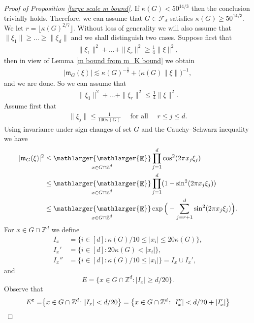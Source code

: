 \documentclass[a4paper,oneside, reqno]{amsart}
\numberwithin{equation}{section}
\theoremstyle{definition}%
\theoremstyle{definition}
\theoremstyle{definition}%
\theoremstyle{definition}
\newcommand{\E}{\mathop{\mathbb{E}}}
\newcommand{\Z}{\mathbb{Z}}
\newcommand{\se}[1]{\underset{_{\substack{#1}}}{\mathlarger{\mathlarger{\E}}}}
\begin{document}
\begin{proof}[Proof of Proposition \ref{large scale m bound}]
If
$\kappa(G)< 50^{14/3}$ then the conclusion trivially
holds. Therefore, we can assume that $G\in\mathcal{F}_d$ satisfies
$\kappa(G)\ge50^{14/3}$.  We let 
$r= \lfloor \kappa(G)^{2/7} \rfloor$.
Without loss of generality we will also assume that $\|\xi_1\|\ge\ldots\ge\|\xi_d\|$ and we shall
distinguish two cases.  Suppose first that
\begin{align*}
  \|\xi_1\|^2+\ldots+\|\xi_r\|^2\ge\frac{1}{4}\|\xi\|^2,
\end{align*}
then in view of Lemma \ref{m bound from m_K bound} we obtain 
\begin{align*}
  |\mathfrak m_G(\xi)|\lesssim \kappa(G)^{-\frac{1}{7}}+\big(\kappa(G)\|\xi\|\big)^{-1},
\end{align*}
and we are done. So we can assume that
\begin{align}
  \label{eq:54}
  \|\xi_1\|^2+\ldots+\|\xi_r\|^2\le\frac{1}{4}\|\xi\|^2.  
\end{align}
Assume first that
\begin{align}
  \label{eq:55}
  \|\xi_j\|\le\frac{1}{100\kappa(G)}\quad\text{ for all } \quad r\le
  j\le d.
\end{align}
Using invariance under sign changes of set $G$ and the Cauchy--Schwarz inequality we have
\begin{align}
  \label{eq:56}
  \begin{split}
  |\mathfrak m_G(\xi)|^2&\le \se{x\in
                          G\cap\Z^d}\prod_{j=1}^d \cos^2(2\pi x_j \xi_j)\\
  &\le \se{x\in
    G\cap\Z^d}\prod_{j=1}^d (1-\sin^2(2\pi x_j \xi_j))\\
  &\le \se{x\in
  G\cap\Z^d}\exp\Big(-\sum_{j=r+1}^d\sin^2(2\pi x_j \xi_j)\Big).
  \end{split}
\end{align}
For $x\in G\cap\Z^d$ we define
\begin{align*}
  I_x&=\{i\in [d]\colon \kappa(G)/10\le |x_i|\le 20\kappa(G) \},\\
  I_x'&=\{i\in [d]\colon 20\kappa(G)< |x_i| \},\\
    I_x''&=\{i\in [d]\colon \kappa(G)/10\le |x_i|\}=I_x\cup I_x',
\end{align*}
 and
\[
E=\big\{x\in G\cap\Z^d\colon |I_x|\ge d/20\big\}.
\]
Observe that
\begin{align*}
  E^{\bf c}=&\big\{x\in G\cap\Z^d\colon |I_x|< d/20\big\}
  =\big\{x\in G\cap\Z^d\colon |I_x''|<d/20+|I_x'|\big\}\\

\end{align*}
\end{proof}
\end{document}
